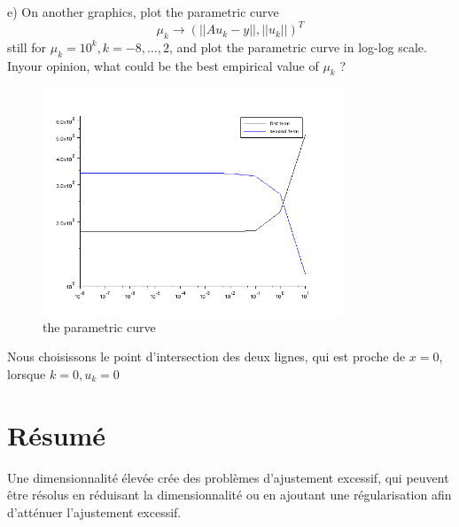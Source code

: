 \documentclass[11pt]{article}
\begin{document}
    e) On another graphics, plot the parametric curve
    \begin{equation}
    \mu_k\rightarrow\left(\left||Au_k-y\right||,\left||u_k\right||\right)^T
    \end{equation}
    still for $\mu_k = 10^k, k = -8, \ldots, 2$, and plot the parametric curve in log-log scale. Inyour opinion, what could be the best empirical value of $\mu_k$ ?
    \begin{figure}[H]
        \centering
        \includegraphics[width=0.8\textwidth,height=0.5\textwidth]{imag}
        \caption{the parametric curve}
    \end{figure} 
    Nous choisissons le point d'intersection des deux lignes, qui est proche de $x=0$, lorsque $k=0,u_k=0$

    \section*{Résumé}
    Une dimensionnalité élevée crée des problèmes d'ajustement excessif, qui peuvent être résolus en réduisant la dimensionnalité ou en ajoutant une régularisation afin d'atténuer l'ajustement excessif.
 
\end{document}
